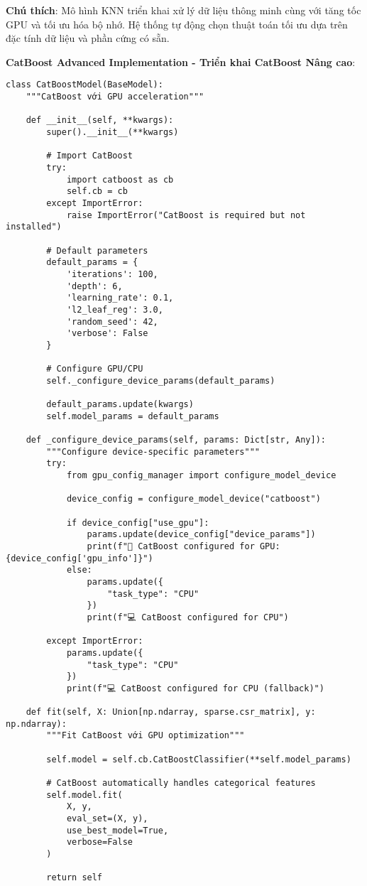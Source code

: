 \textbf{Chú thích}: Mô hình KNN triển khai xử lý dữ liệu thông minh cùng với tăng tốc GPU và tối ưu hóa bộ nhớ. Hệ thống tự động chọn thuật toán tối ưu dựa trên đặc tính dữ liệu và phần cứng có sẵn.

\textbf{CatBoost Advanced Implementation - Triển khai CatBoost Nâng cao}:

\begin{verbatim}
class CatBoostModel(BaseModel):
    """CatBoost với GPU acceleration"""
    
    def __init__(self, **kwargs):
        super().__init__(**kwargs)
        
        # Import CatBoost
        try:
            import catboost as cb
            self.cb = cb
        except ImportError:
            raise ImportError("CatBoost is required but not installed")
            
        # Default parameters
        default_params = {
            'iterations': 100,
            'depth': 6,
            'learning_rate': 0.1,
            'l2_leaf_reg': 3.0,
            'random_seed': 42,
            'verbose': False
        }
        
        # Configure GPU/CPU
        self._configure_device_params(default_params)
        
        default_params.update(kwargs)
        self.model_params = default_params
        
    def _configure_device_params(self, params: Dict[str, Any]):
        """Configure device-specific parameters"""
        try:
            from gpu_config_manager import configure_model_device
            
            device_config = configure_model_device("catboost")
            
            if device_config["use_gpu"]:
                params.update(device_config["device_params"])
                print(f"🚀 CatBoost configured for GPU: {device_config['gpu_info']}")
            else:
                params.update({
                    "task_type": "CPU"
                })
                print(f"💻 CatBoost configured for CPU")
                
        except ImportError:
            params.update({
                "task_type": "CPU"
            })
            print(f"💻 CatBoost configured for CPU (fallback)")
            
    def fit(self, X: Union[np.ndarray, sparse.csr_matrix], y: np.ndarray):
        """Fit CatBoost với GPU optimization"""
        
        self.model = self.cb.CatBoostClassifier(**self.model_params)
        
        # CatBoost automatically handles categorical features
        self.model.fit(
            X, y,
            eval_set=(X, y),
            use_best_model=True,
            verbose=False
        )
        
        return self
\end{verbatim}

